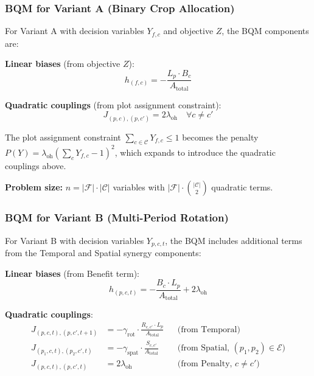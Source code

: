 \documentclass{oqireport}
\begin{document}
\subsubsection{BQM for Variant A (Binary Crop Allocation)}

For Variant A with decision variables $Y_{f,c}$ and objective $Z$, the BQM components are:

\textbf{Linear biases} (from objective $Z$):
\begin{equation}
h_{(f,c)} = -\frac{L_p \cdot B_c}{A_{\text{total}}}
\end{equation}

\textbf{Quadratic couplings} (from plot assignment constraint):
\begin{equation}
J_{(p,c),(p,c')} = 2\lambda_{\text{oh}} \quad \forall c \neq c'
\end{equation}

The plot assignment constraint $\sum_{c \in \mathcal{C}} Y_{f,c} \leq 1$ becomes the penalty $P(Y) = \lambda_{\text{oh}} \left(\sum_{c} Y_{f,c} -1\right)^2$, which expands to introduce the quadratic couplings above.

\textbf{Problem size:} $n = |\mathcal{F}| \cdot |\mathcal{C}|$ variables with $|\mathcal{F}| \cdot \binom{|\mathcal{C}|}{2}$ quadratic terms.

\subsubsection{BQM for Variant B (Multi-Period Rotation)}

For Variant B with decision variables $Y_{p,c,t}$, the BQM includes additional terms from the Temporal and Spatial synergy components:

\textbf{Linear biases} (from Benefit term):
\begin{equation}
h_{(p,c,t)} = -\frac{B_c \cdot L_p}{A_{\text{total}}} + 2\lambda_{\text{oh}}
\end{equation}

\textbf{Quadratic couplings}:
\begin{align}
J_{(p,c,t),(p,c',t+1)} &= -\gamma_{\text{rot}} \cdot \frac{R_{c,c'} \cdot L_p}{A_{\text{total}}} && \text{(from Temporal)} \\
J_{(p_1,c,t),(p_2,c',t)} &= -\gamma_{\text{spat}} \cdot \frac{S_{c,c'}}{A_{\text{total}}} && \text{(from Spatial, } (p_1,p_2) \in \mathcal{E} \text{)} \\
J_{(p,c,t),(p,c',t)} &= 2\lambda_{\text{oh}} && \text{(from Penalty, } c \neq c' \text{)}
\end{align}
\end{document}
